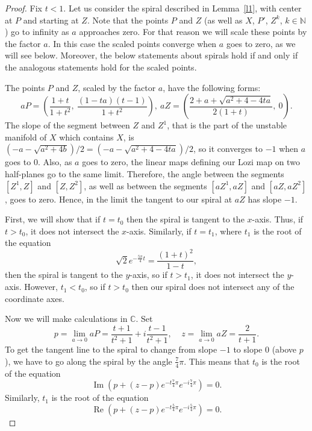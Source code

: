 \documentclass[12pt]{amsart}
\theoremstyle{plain}
\theoremstyle{definition}
\def\N{{\mathbb N}}
\newcommand{\C}{\mathbb{C}}
\newcommand{\re}{\operatorname{Re}}
\newcommand{\im}{\operatorname{Im}}
\begin{document}
	\begin{proof}
		Fix $t < 1$. Let us consider the spiral described in Lemma~\ref{l1}, 
		with center at $P$ and starting at $Z$. Note that the points $P$ 
		and $Z$ (as well as $X$, $P'$, $Z^k$, $k \in \N$) go to infinity as 
		$a$ approaches zero. For that reason we will scale these points by 
		the factor $a$. In this case the scaled points converge when $a$ goes 
		to zero, as we will see below. Moreover, the below statements about 
		spirals hold if and only if the analogous statements hold for the 
		scaled points. 
		
		The points $P$ and $Z$, scaled by the factor $a$, have the following 
		forms:
		$$aP = \left(\frac{1+t}{1 + t^2}, \ \frac{(1 - ta)(t-1)}{1 + t^2}\right), 
		\ aZ = \left( \frac{2 + a + \sqrt{a^2 + 4 - 4ta}}{2(1 + t)}, \ 0 \right).
		$$ 
		The slope of the segment between $Z$ and $Z^1$, that is the part of the 
		unstable manifold of $X$ which contains $X$, is
		$(-a - \sqrt{a^2 + 4b})/2 = (-a - \sqrt{a^2 + 4 - 4ta})/2$, so it 
		converges to $-1$ when $a$ goes to $0$. Also, as $a$ goes to zero, the 
		linear maps defining our Lozi map on two half-planes go to the same limit. 
		Therefore, the angle between the segments $[Z^1, Z]$ and $[Z, Z^2]$, as 
		well as between the segments $[aZ^1, aZ]$ and $[aZ, aZ^2]$, goes to zero. 
		Hence, in the limit the tangent to our spiral at $aZ$ has slope $-1$. 	
		
		First, we will show that if $t = t_0$ then the spiral is tangent to the 
		$x$-axis. Thus, if $t > t_0$, it does not intersect the $x$-axis. 
		Similarly, if $t = t_1$, where $t_1$ is the root of the equation
		\begin{equation}\label{e2}
			\sqrt{2} e^{-\frac{5\pi}{4}t} = \frac{(1 + t)^2}{1 - t},
		\end{equation}
		then the spiral is tangent to the $y$-axis, so if $t  > t_1$, it does not
		intersect the $y$-axis. However, $t_1 < t_0$, so if $t > t_0$ then our
		spiral does not intersect any of the coordinate axes.
		
		Now we will make calculations in $\C$. Set
		\[
		p = \lim_{a \to 0}aP = \frac{t + 1}{t^2 + 1} + i\frac{t - 1}{t^2 + 1},
		\ \ \ \ \ z = \lim_{a \to 0}aZ = \frac2{t + 1}.
		\]
		To get the tangent line to the spiral to change from slope $-1$ to slope 
		$0$ (above $p$), we have to go along the spiral by the angle $\frac74\pi$. 
		This means that $t_0$ is the root of the equation
		\begin{equation}\label{e3}
			\im\left(p + (z - p)e^{-t \frac74 \pi}e^{-i \frac74 \pi}\right) = 0.
		\end{equation}
		Similarly, $t_1$ is the root of the equation
		\begin{equation}\label{e4}
			\re\left(p + (z - p)e^{-t \frac54 \pi}e^{-i \frac54 \pi}\right) = 0.
		\end{equation}
		

\end{proof}
\end{document}
